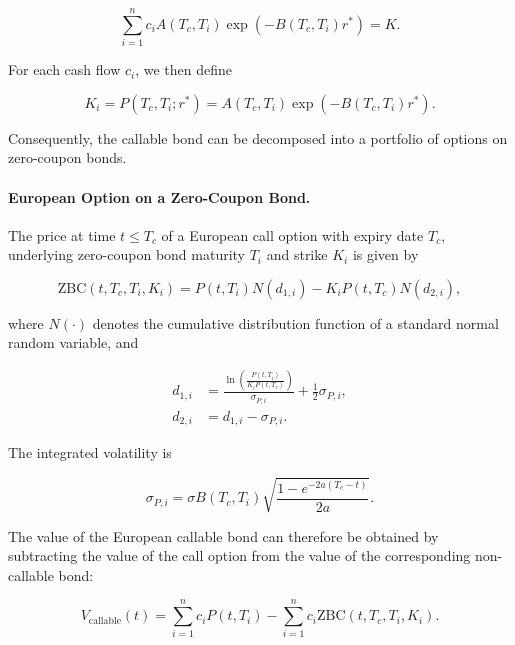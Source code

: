 \documentclass{article}
\begin{document}
\begin{equation}
    \sum_{i=1}^{n}
    c_i
    A(T_c,T_i)
    \exp
    \left(
        -B(T_c,T_i)r^*
    \right)
    =
    K.
\end{equation}

For each cash flow $c_i$, we then define

\begin{equation}
    K_i
    =
    P(T_c,T_i;r^*)
    =
    A(T_c,T_i)
    \exp
    \left(
        -B(T_c,T_i)r^*
    \right).
\end{equation}

Consequently, the callable bond can be decomposed into a portfolio
of options on zero-coupon bonds.


\paragraph{European Option on a Zero-Coupon Bond.}

The price at time $t\leq T_c$ of a European call option with expiry
date $T_c$, underlying zero-coupon bond maturity $T_i$ and strike
$K_i$ is given by

\begin{equation}
    \mathrm{ZBC}(t,T_c,T_i,K_i)
    =
    P(t,T_i)N(d_{1,i})
    -
    K_iP(t,T_c)N(d_{2,i}),
\end{equation}

where $N(\cdot)$ denotes the cumulative distribution function of a
standard normal random variable, and

\begin{align}
    d_{1,i}
    &=
    \frac{
        \ln
        \left(
            \frac{P(t,T_i)}
            {K_iP(t,T_c)}
        \right)
    }{\sigma_{P,i}}
    +
    \frac{1}{2}\sigma_{P,i},
    \\[6pt]
    d_{2,i}
    &=
    d_{1,i}-\sigma_{P,i}.
\end{align}

The integrated volatility is

\begin{equation}
    \sigma_{P,i}
    =
    \sigma
    B(T_c,T_i)
    \sqrt{
        \frac{
            1-e^{-2a(T_c-t)}
        }{2a}
    }.
\end{equation}

The value of the European callable bond can therefore be obtained
by subtracting the value of the call option from the value of the
corresponding non-callable bond:

\begin{equation}
    V_{\mathrm{callable}}(t)
    =
    \sum_{i=1}^{n}
    c_iP(t,T_i)
    -
    \sum_{i=1}^{n}
    c_i
    \mathrm{ZBC}(t,T_c,T_i,K_i).
\end{equation}
\end{document}
